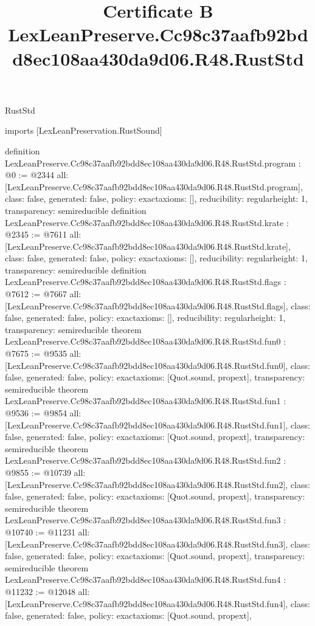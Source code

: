 \begin{lexlean}{RustStd}
\title{Certificate B LexLeanPreserve.Cc98c37aafb92bdd8ec108aa430da9d06.R48.RustStd}
\begin{coremodule}
imports [LexLeanPreservation.RustSound]

definition LexLeanPreserve.Cc98c37aafb92bdd8ec108aa430da9d06.R48.RustStd.program : @0 := @2344 {
  all: [LexLeanPreserve.Cc98c37aafb92bdd8ec108aa430da9d06.R48.RustStd.program],
  class: false,
  generated: false,
  policy: exact{axioms: []},
  reducibility: regular{height: 1},
  transparency: semireducible
}
definition LexLeanPreserve.Cc98c37aafb92bdd8ec108aa430da9d06.R48.RustStd.krate : @2345 := @7611 {
  all: [LexLeanPreserve.Cc98c37aafb92bdd8ec108aa430da9d06.R48.RustStd.krate],
  class: false,
  generated: false,
  policy: exact{axioms: []},
  reducibility: regular{height: 1},
  transparency: semireducible
}
definition LexLeanPreserve.Cc98c37aafb92bdd8ec108aa430da9d06.R48.RustStd.flags : @7612 := @7667 {
  all: [LexLeanPreserve.Cc98c37aafb92bdd8ec108aa430da9d06.R48.RustStd.flags],
  class: false,
  generated: false,
  policy: exact{axioms: []},
  reducibility: regular{height: 1},
  transparency: semireducible
}
theorem LexLeanPreserve.Cc98c37aafb92bdd8ec108aa430da9d06.R48.RustStd.fun0 : @7675 := @9535 {
  all: [LexLeanPreserve.Cc98c37aafb92bdd8ec108aa430da9d06.R48.RustStd.fun0],
  class: false,
  generated: false,
  policy: exact{axioms: [Quot.sound, propext]},
  transparency: semireducible
}
theorem LexLeanPreserve.Cc98c37aafb92bdd8ec108aa430da9d06.R48.RustStd.fun1 : @9536 := @9854 {
  all: [LexLeanPreserve.Cc98c37aafb92bdd8ec108aa430da9d06.R48.RustStd.fun1],
  class: false,
  generated: false,
  policy: exact{axioms: [Quot.sound, propext]},
  transparency: semireducible
}
theorem LexLeanPreserve.Cc98c37aafb92bdd8ec108aa430da9d06.R48.RustStd.fun2 : @9855 := @10739 {
  all: [LexLeanPreserve.Cc98c37aafb92bdd8ec108aa430da9d06.R48.RustStd.fun2],
  class: false,
  generated: false,
  policy: exact{axioms: [Quot.sound, propext]},
  transparency: semireducible
}
theorem LexLeanPreserve.Cc98c37aafb92bdd8ec108aa430da9d06.R48.RustStd.fun3 : @10740 := @11231 {
  all: [LexLeanPreserve.Cc98c37aafb92bdd8ec108aa430da9d06.R48.RustStd.fun3],
  class: false,
  generated: false,
  policy: exact{axioms: [Quot.sound, propext]},
  transparency: semireducible
}
theorem LexLeanPreserve.Cc98c37aafb92bdd8ec108aa430da9d06.R48.RustStd.fun4 : @11232 := @12048 {
  all: [LexLeanPreserve.Cc98c37aafb92bdd8ec108aa430da9d06.R48.RustStd.fun4],
  class: false,
  generated: false,
  policy: exact{axioms: [Quot.sound, propext]},
}
\end{coremodule}
\end{lexlean}
